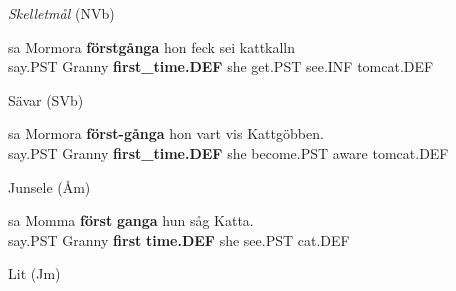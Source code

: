 \item 

\textit{Skelletmål} (NVb)



 \ea\label{}
\gll sa  Mormora  \textbf{förstgånga} hon  feck  sei  kattkalln\\


say.PST  Granny  \textbf{first\_time.DEF} she  get.PST  see.INF  tomcat.DEF\\

\item 

Sävar (SVb)



 \ea\label{}
\gll sa  Mormora  \textbf{först-gånga} hon  vart  vis  Kattgöbben.\\


say.PST  Granny  \textbf{first\_time.DEF} she  become.PST  aware  tomcat.DEF\\

\item 

Junsele (Åm)



 \ea\label{}
\gll sa  Momma  \textbf{först}\textbf{  ganga} hun  såg  Katta.\\


say.PST  Granny  \textbf{first} \textbf{time.DEF} she  see.PST  cat.DEF\\

\item 

Lit (Jm)

